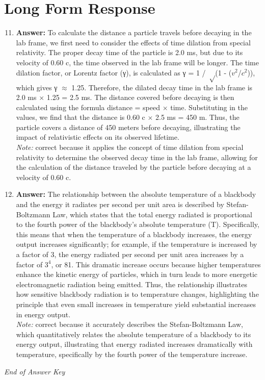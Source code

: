 \documentclass[12pt]{article}
\begin{document}
\section*{Long Form Response}
\begin{enumerate}[label=\arabic*.]
\setcounter{enumi}{10}
\item \textbf{Answer:} To calculate the distance a particle travels before decaying in the lab frame, we first need to consider the effects of time dilation from special relativity. The proper decay time of the particle is 2.0 ms, but due to its velocity of 0.60 c, the time observed in the lab frame will be longer. The time dilation factor, or Lorentz factor (γ), is calculated as γ = 1 / \ensuremath{\sqrt}(1 - ($v^2$/$c^2$)), which gives γ \ensuremath{\approx} 1.25. Therefore, the dilated decay time in the lab frame is 2.0 ms \ensuremath{\times} 1.25 = 2.5 ms. The distance covered before decaying is then calculated using the formula distance = speed \ensuremath{\times} time. Substituting in the values, we find that the distance is 0.60 c \ensuremath{\times} 2.5 ms = 450 m. Thus, the particle covers a distance of 450 meters before decaying, illustrating the impact of relativistic effects on its observed lifetime.
\\ \textit{Note:} correct because it applies the concept of time dilation from special relativity to determine the observed decay time in the lab frame, allowing for the calculation of the distance traveled by the particle before decaying at a velocity of 0.60 c.
\item \textbf{Answer:} The relationship between the absolute temperature of a blackbody and the energy it radiates per second per unit area is described by Stefan-Boltzmann Law, which states that the total energy radiated is proportional to the fourth power of the blackbody's absolute temperature (T). Specifically, this means that when the temperature of a blackbody increases, the energy output increases significantly; for example, if the temperature is increased by a factor of 3, the energy radiated per second per unit area increases by a factor of $3^4$, or 81. This dramatic increase occurs because higher temperatures enhance the kinetic energy of particles, which in turn leads to more energetic electromagnetic radiation being emitted. Thus, the relationship illustrates how sensitive blackbody radiation is to temperature changes, highlighting the principle that even small increases in temperature yield substantial increases in energy output.
\\ \textit{Note:} correct because it accurately describes the Stefan-Boltzmann Law, which quantitatively relates the absolute temperature of a blackbody to its energy output, illustrating that energy radiated increases dramatically with temperature, specifically by the fourth power of the temperature increase.
\end{enumerate}

\vfill
\noindent\textit{End of Answer Key}
\end{document}
